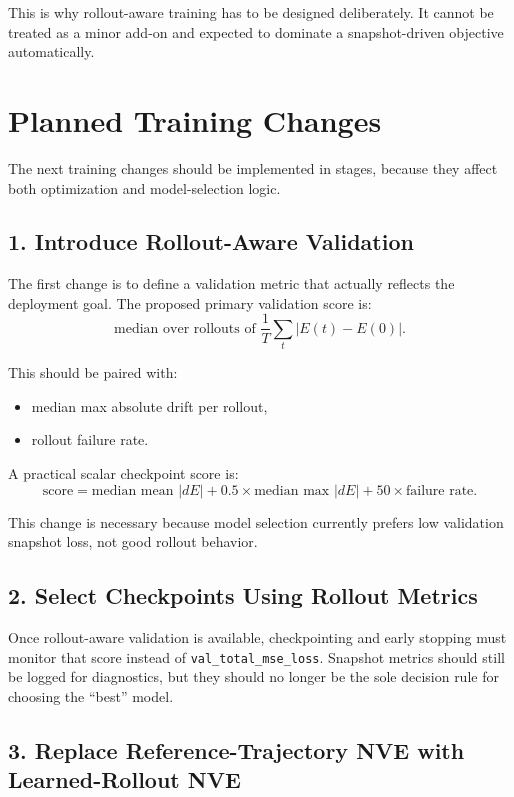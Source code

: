\documentclass[11pt]{article}
\begin{document}
This is why rollout-aware training has to be designed deliberately. It cannot be treated as a minor add-on and expected to dominate a snapshot-driven objective automatically.

\section{Planned Training Changes}

The next training changes should be implemented in stages, because they affect both optimization and model-selection logic.

\subsection{1. Introduce Rollout-Aware Validation}

The first change is to define a validation metric that actually reflects the deployment goal. The proposed primary validation score is:
\[
\text{median over rollouts of } \frac{1}{T} \sum_t |E(t)-E(0)|.
\]

This should be paired with:

\begin{itemize}
  \item median max absolute drift per rollout,
  \item rollout failure rate.
\end{itemize}

A practical scalar checkpoint score is:
\[
\text{score}
=
\text{median mean } |dE|
+
0.5 \times \text{median max } |dE|
+
50 \times \text{failure rate}.
\]

This change is necessary because model selection currently prefers low validation snapshot loss, not good rollout behavior.

\subsection{2. Select Checkpoints Using Rollout Metrics}

Once rollout-aware validation is available, checkpointing and early stopping must monitor that score instead of \texttt{val\_total\_mse\_loss}. Snapshot metrics should still be logged for diagnostics, but they should no longer be the sole decision rule for choosing the ``best'' model.

\subsection{3. Replace Reference-Trajectory NVE with Learned-Rollout NVE}
\end{document}
